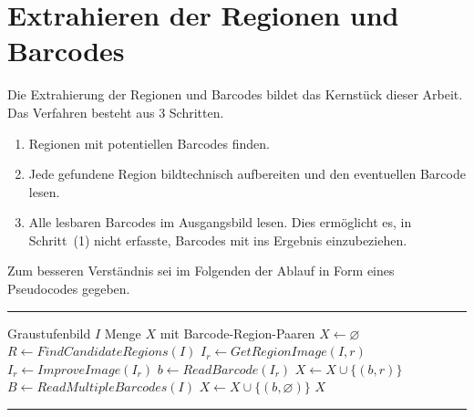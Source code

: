\section{Extrahieren der Regionen und Barcodes}
\label{sec:extraction}
\writtenby{\dcauthornameewie}%
%
Die Extrahierung der Regionen und Barcodes bildet das Kernstück dieser Arbeit.
Das Verfahren besteht aus 3 Schritten.
%
\begin{enumerate}[(1)]
\item Regionen mit potentiellen Barcodes finden.
\item Jede gefundene Region bildtechnisch aufbereiten und den eventuellen Barcode lesen.
\item Alle lesbaren Barcodes im Ausgangsbild lesen.
Dies ermöglicht es, in Schritt~(1) nicht erfasste, Barcodes mit ins Ergebnis einzubeziehen.
\end{enumerate}
%
Zum besseren Verständnis sei im Folgenden der Ablauf in Form eines Pseudocodes gegeben.
%
\vspace{1em}
\hrule
\vspace{0.5em}
\begin{algorithmic}
\Require Graustufenbild $I$
\Ensure Menge $X$ mit Barcode-Region-Paaren
\State $X\gets\varnothing$
\State $R\gets FindCandidateRegions(I)$
  \State $I_r\gets GetRegionImage(I,r)$
  \State $I_r\gets ImproveImage(I_r)$
  \State $b\gets ReadBarcode(I_r)$
  \State $X\gets X\cup \{(b,r)\}$
\EndFor
\State $B\gets ReadMultipleBarcodes(I)$
    \State $X\gets X\cup \{(b,\varnothing)\}$
  \EndIf
\EndFor
\State\Return $X$
\end{algorithmic}
\vspace{0.5em}
\hrule
\vspace{1em}
